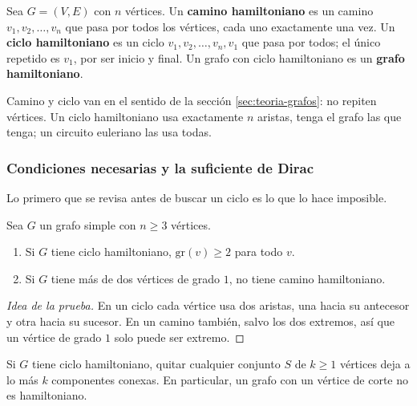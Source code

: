 \documentclass[11pt,letterpaper]{article}
\begin{document}
\begin{definicion}
  \label{def:hamilton-camino}
  Sea $G = (V, E)$ con $n$ vértices. Un \textbf{camino hamiltoniano}
  es un camino $v_1, v_2, \dots, v_n$ que pasa por todos los
  vértices, cada uno exactamente una vez. Un \textbf{ciclo
  hamiltoniano} es un ciclo $v_1, v_2, \dots, v_n, v_1$ que pasa por
  todos; el único repetido es $v_1$, por ser inicio y final. Un grafo
  con ciclo hamiltoniano es un \textbf{grafo hamiltoniano}.
\end{definicion}

Camino y ciclo van en el sentido de la sección
\ref{sec:teoria-grafos}: no repiten vértices. Un ciclo hamiltoniano
usa exactamente $n$ aristas, tenga el grafo las que tenga; un circuito
euleriano las usa todas.

\subsubsection*{Condiciones necesarias y la suficiente de Dirac}

Lo primero que se revisa antes de buscar un ciclo es lo que lo hace
imposible.

\begin{teorema}
  \label{teo:hamilton-grado}
  Sea $G$ un grafo simple con $n \ge 3$ vértices.
  \begin{enumerate}[label=(\alph*), itemsep=0pt, parsep=0pt]
    \item Si $G$ tiene ciclo hamiltoniano, $\text{gr}(v) \ge 2$ para
          todo $v$.
    \item Si $G$ tiene más de dos vértices de grado $1$, no tiene
          camino hamiltoniano.
  \end{enumerate}
\end{teorema}

\begin{proof}[Idea de la prueba]
  En un ciclo cada vértice usa dos aristas, una hacia su antecesor y
  otra hacia su sucesor. En un camino también, salvo los dos extremos,
  así que un vértice de grado $1$ solo puede ser extremo.
\end{proof}

\begin{teorema}
  \label{teo:hamilton-corte}
  Si $G$ tiene ciclo hamiltoniano, quitar cualquier conjunto $S$ de
  $k \ge 1$ vértices deja a lo más $k$ componentes conexas. En
  particular, un grafo con un vértice de corte no es hamiltoniano.
\end{teorema}
\end{document}
